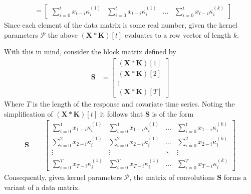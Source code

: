 \documentclass{article}
\begin{document}
\begin{align*}
			&=  \begin{bmatrix} \sum_{i=0}^t  x_{t-i} \kappa^{(1)}_{i}  & \sum_{i=0}^t  x_{t-i} \kappa^{(1)}_{i} & \dots & \sum_{i=0}^t  x_{t-i} \kappa^{(k)}_{i} \end{bmatrix}   
	\end{align*}
	Since each element of the data matrix is some real number, given the kernel parameters $\mathcal{P}$ the above $(\mathbf{X} \ast \mathbf{K})[t]$ evaluates to a row vector of length $k$. 
	
	With this in mind, consider the block matrix defined by
    \begin{align*}
    \mathbf{S} &= \begin{bmatrix}
    	(\mathbf{X} \ast \mathbf{K})[1] \\
    	(\mathbf{X} \ast \mathbf{K})[2] \\
    	\vdots \\
    	(\mathbf{X} \ast \mathbf{K})[T]
    \end{bmatrix}
\end{align*}
Where $T$ is the length of the response and covariate time series. Noting the simplification of $(\mathbf{X} \ast \mathbf{K})[t]$ it follows that $\mathbf{S}$ is of the form
   \begin{align*}
	\mathbf{S} &= \begin{bmatrix}
		\sum_{i=0}^1  x_{1-i} \kappa^{(1)}_{i}  & \sum_{i=0}^1 x_{1-i} \kappa^{(1)}_{i} & \dots & \sum_{i=0}^1  x_{1-i} \kappa^{(k)}_{i} \\
		\sum_{i=0}^2  x_{2-i} \kappa^{(1)}_{i}  & \sum_{i=0}^2 x_{2-i} \kappa^{(1)}_{i} & \dots & \sum_{i=0}^2  x_{2-i} \kappa^{(k)}_{i}\\
		\vdots & \vdots& \ddots & \vdots\\
		\sum_{i=0}^T  x_{T-i} \kappa^{(1)}_{i}  & \sum_{i=0}^T x_{T-i} \kappa^{(1)}_{i} & \dots & \sum_{i=0}^T  x_{T-i} \kappa^{(k)}_{i}
	\end{bmatrix}
\end{align*}
Consequently, given kernel parameters $\mathcal{P}$, the matrix of convolutions $\mathbf{S}$ forms a variant of a data matrix. 
\end{document}
